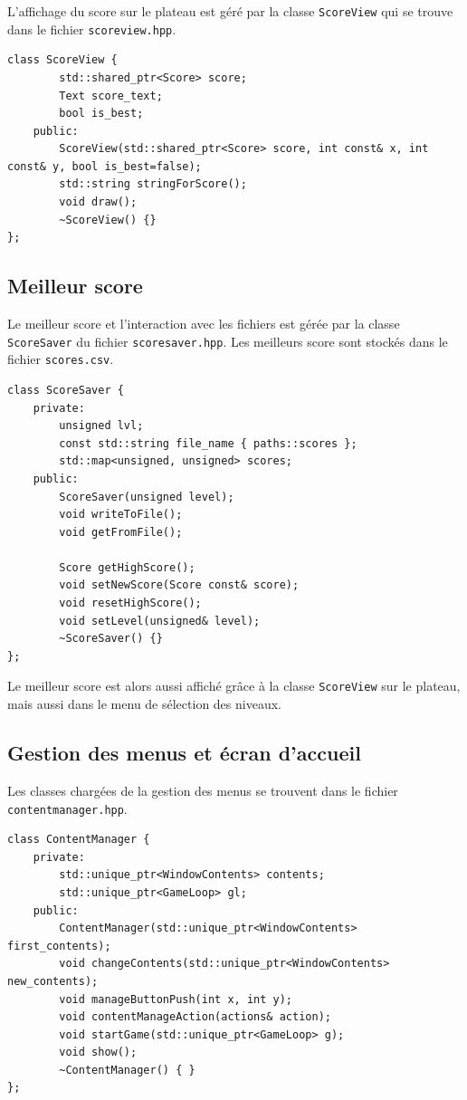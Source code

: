 \documentclass[a4paper, 12pt]{article}
\begin{document}
L'affichage du score sur le plateau est géré par la classe \texttt{ScoreView}
qui se trouve dans le fichier \texttt{scoreview.hpp}.

\begin{lstlisting}
class ScoreView {
        std::shared_ptr<Score> score;
        Text score_text;
        bool is_best;
    public:
        ScoreView(std::shared_ptr<Score> score, int const& x, int const& y, bool is_best=false);
        std::string stringForScore();
        void draw();
        ~ScoreView() {}
};
\end{lstlisting}

\subsection{Meilleur score}

Le meilleur score et l'interaction avec les fichiers est gérée par la classe \texttt{ScoreSaver} 
du fichier \texttt{scoresaver.hpp}.
Les meilleurs score sont stockés dans le fichier \texttt{scores.csv}.

\begin{lstlisting}
class ScoreSaver {
    private:
        unsigned lvl;
        const std::string file_name { paths::scores };
        std::map<unsigned, unsigned> scores;
    public:
        ScoreSaver(unsigned level);
        void writeToFile();
        void getFromFile();

        Score getHighScore();
        void setNewScore(Score const& score);
        void resetHighScore();
        void setLevel(unsigned& level);
        ~ScoreSaver() {}
};
\end{lstlisting}

Le meilleur score est alors aussi affiché grâce à la classe \texttt{ScoreView} sur le plateau,
mais aussi dans le menu de sélection des niveaux.

\subsection{Gestion des menus et écran d'accueil}

Les classes chargées de la gestion des menus se trouvent 
dans le fichier \texttt{content\textunderscore manager.hpp}.

\begin{lstlisting}
class ContentManager {
    private:
        std::unique_ptr<WindowContents> contents;
        std::unique_ptr<GameLoop> gl;
    public:
        ContentManager(std::unique_ptr<WindowContents> first_contents);
        void changeContents(std::unique_ptr<WindowContents> new_contents);
        void manageButtonPush(int x, int y);
        void contentManageAction(actions& action);
        void startGame(std::unique_ptr<GameLoop> g);
        void show();
        ~ContentManager() { }
};
\end{lstlisting}
\end{document}

